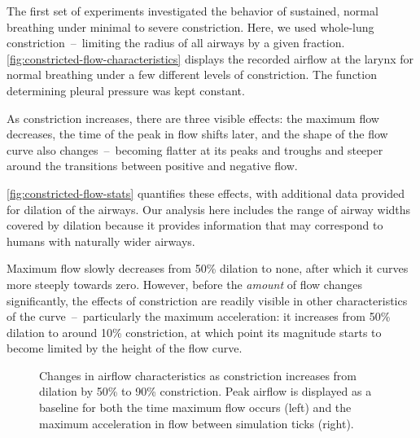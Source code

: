 The first set of experiments investigated the behavior of sustained, normal breathing under minimal
to severe constriction. Here, we used whole-lung constriction~--~limiting the radius of all airways
by a given fraction. \autoref{fig:constricted-flow-characteristics} displays the recorded airflow at
the larynx for normal breathing under a few different levels of constriction. The function
determining pleural pressure was kept constant.

As constriction increases, there are three visible effects: the maximum flow decreases, the time of
the peak in flow shifts later, and the shape of the flow curve also changes~--~becoming flatter at
its peaks and troughs and steeper around the transitions between positive and negative flow.

\autoref{fig:constricted-flow-stats} quantifies these effects, with additional data provided for
dilation of the airways. Our analysis here includes the range of airway widths covered by dilation
because it provides information that may correspond to humans with naturally wider airways.

Maximum flow slowly decreases from 50\% dilation to none, after which it curves more steeply towards
zero. However, before the \textit{amount} of flow changes significantly, the effects of constriction
are readily visible in other characteristics of the curve~--~particularly the maximum acceleration:
it increases from 50\% dilation to around 10\% constriction, at which point its magnitude starts to
become limited by the height of the flow curve.

\begin{figure}[ht!]
    \centering
    \begin{subfigure}[t]{.45\textwidth}
        \centering
        \begin{tikzpicture}[scale=.75]
            
        \end{tikzpicture}
    \end{subfigure}%
    \hspace{2em}%
    \begin{subfigure}[t]{.45\textwidth}
        \centering
        \begin{tikzpicture}[scale=.75]
            
        \end{tikzpicture}
    \end{subfigure}%
    \caption{
        Changes in airflow characteristics as constriction increases from dilation by 50\% to 90\%
        constriction. Peak airflow is displayed as a baseline for both the time maximum flow occurs
        (left) and the maximum acceleration in flow between simulation ticks (right).
    }
    \label{fig:constricted-flow-stats}
\end{figure}

